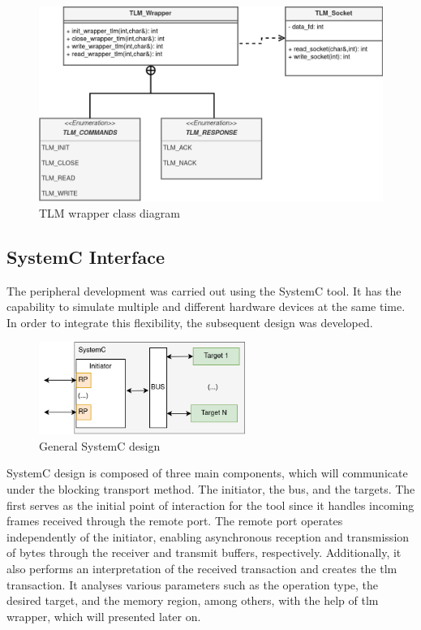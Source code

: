 \begin{figure}[!ht]
	\centering
 	\includegraphics[width=0.7\linewidth]{Images/TLM_Wrapper_ClassDiagram.png} 
 	\caption{TLM wrapper class diagram}
	\label{fig_TLM_Wrapper_ClassDiagram}
\end{figure}

\subsection{SystemC Interface}

The peripheral development was carried out using the SystemC tool. It has the capability to simulate multiple and different hardware devices 
at the same time. In order to integrate this flexibility, the subsequent design was developed.

\begin{figure}[H]
	\centering
	\includegraphics[width=0.6\textwidth]{Images/SystemCdesign.png}
	\caption{General SystemC design}
	\label{fig_SystemCdesign_geral}
\end{figure}


SystemC design is composed of three main components, which will communicate under the blocking transport method. 
The initiator, the bus, and the targets.
The first serves as the initial 
point of interaction for the tool since it handles incoming frames received through the remote port. The remote port operates independently 
of the initiator, enabling asynchronous reception and transmission of bytes through the receiver and transmit buffers, respectively.
Additionally, it also performs an interpretation of the received transaction and creates the \gls{tlm} transaction. It analyses various 
parameters such as the operation type, the desired target, and the memory region, among others, with the help of \gls{tlm} wrapper, 
which will presented later on.

